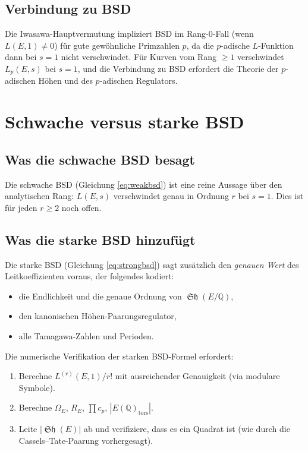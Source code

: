 \documentclass[12pt,a4paper]{article}
\theoremstyle{remark}
\DeclareMathOperator{\Sha}{\mathfrak{Sh}}
\begin{document}
\subsection{Verbindung zu BSD}

Die Iwasawa-Hauptvermutung impliziert BSD im Rang-0-Fall (wenn $L(E,1) \neq 0$) für gute
gewöhnliche Primzahlen $p$, da die $p$-adische $L$-Funktion dann bei $s=1$ nicht
verschwindet. Für Kurven vom Rang $\geq 1$ verschwindet $L_p(E,s)$ bei $s=1$, und die
Verbindung zu BSD erfordert die Theorie der $p$-adischen Höhen und des $p$-adischen
Regulators.

\section{Schwache versus starke BSD}

\subsection{Was die schwache BSD besagt}

Die schwache BSD (Gleichung \eqref{eq:weakbsd}) ist eine reine Aussage über den
analytischen Rang: $L(E,s)$ verschwindet genau in Ordnung $r$ bei $s=1$. Dies ist
für jeden $r \geq 2$ noch offen.

\subsection{Was die starke BSD hinzufügt}

Die starke BSD (Gleichung \eqref{eq:strongbsd}) sagt zusätzlich den \emph{genauen Wert}
des Leitkoeffizienten voraus, der folgendes kodiert:
\begin{itemize}[nosep]
  \item die Endlichkeit und die genaue Ordnung von $\Sha(E/\mathbb{Q})$,
  \item den kanonischen Höhen-Paarungsregulator,
  \item alle Tamagawa-Zahlen und Perioden.
\end{itemize}

Die numerische Verifikation der starken BSD-Formel erfordert:
\begin{enumerate}[nosep]
  \item Berechne $L^{(r)}(E,1)/r!$ mit ausreichender Genauigkeit (via modulare Symbole).
  \item Berechne $\Omega_E$, $R_E$, $\prod c_p$, $|E(\mathbb{Q})_{\mathrm{tors}}|$.
  \item Leite $|\Sha(E)|$ ab und verifiziere, dass es ein Quadrat ist (wie durch die
        Cassels--Tate-Paarung vorhergesagt).
\end{enumerate}
\end{document}
